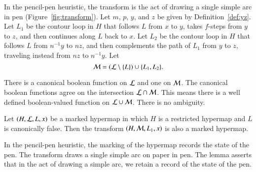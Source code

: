 \figKCSQIOY %

In the pencil-pen heuristic, the transform is the act of drawing a single simple arc in
pen (Figure~\ref{fig:transform}).
Let $m$, $p$, $y$, and $z$ be  given by
Definition~\ref{def:yz}.
Let $L_1$ be 
the contour loop in $H$ that follows $L$ from $x$ to $y$,  takes
$f$-steps from $y$ to $z$, and then continues along $L$ back to $x$.  
Let $L_2$ be
the contour loop in $H$ that follows $L$ from $n^{-1} y$ to $n z$, and
then complements the path of $L_1$ from $y$ to $z$, traveling instead
from $n z$ to $n^{-1} y$. 
Let
\begin{equation}\label{eqn:ML} 
{\cal M} = ({\cal L}\setminus \{L\}) \cup\{L_1,L_2\}.
\end{equation}

\begin{remark}
There is a canonical boolean function on ${\cal L}$ and one on ${\cal M}$.
The canonical boolean functions agree on the intersection ${\cal L}\cap {\cal M}$.
This means there is a well defined boolean-valued function on 
${\cal L}\cup {\cal M}$.  There is no ambiguity.  
\end{remark}




\begin{lemma}\label{lemma:flag} 

Let $(H,{\cal L},L,x)$ be a marked hypermap in which
 $H$ is a restricted hypermap and $L$
is canonically false.  Then the transform
$(H,{\cal M},L_1,x)$ 
is also a marked hypermap.
\end{lemma}

In the pencil-pen heuristic, the marking of the hypermap records the
state of the pen.  The transform draws a single simple arc on paper in
pen.  The lemma asserts that in the act of drawing a simple arc, we
retain a record of the state of the pen.

